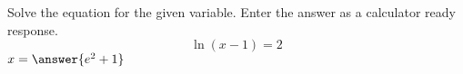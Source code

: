 \documentclass{ximera}
\author{David Kish}
\begin{document}
\begin{exercise}
Solve the equation for the given variable. Enter the answer as a calculator ready response.\\
\[
\ln(x-1)=2
\]
$x=\answer{e^2+1}$
\end{exercise}
\end{document}
